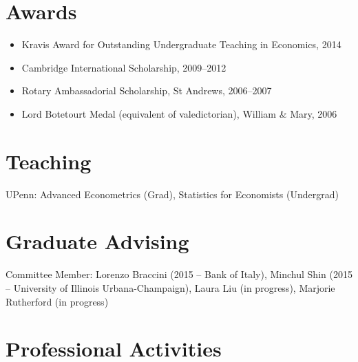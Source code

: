 \documentclass[line,overlapped]{myres}
\begin{document}
\begin{resume}
\section{\sc Awards}
\vspace{1em}
\begin{itemize}
\item Kravis Award for Outstanding Undergraduate Teaching in Economics, 2014
\item Cambridge International Scholarship, 2009--2012
\item Rotary Ambassadorial Scholarship, St Andrews, 2006--2007
\item Lord Botetourt Medal (equivalent of valedictorian), William \& Mary, 2006
\end{itemize}

\section{\sc Teaching }
\vspace{0.5em}
	UPenn: Advanced Econometrics (Grad), Statistics for Economists (Undergrad)
	


\section{\sc Graduate Advising}
\vspace{0.5em}
Committee Member: Lorenzo Braccini (2015 -- Bank of Italy), Minchul Shin (2015 -- University of Illinois Urbana-Champaign), Laura Liu (in progress), Marjorie Rutherford (in progress)


\section{\sc Professional Activities}
\vspace{1em}


\end{resume}
\end{document}
